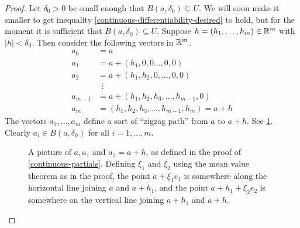 \begin{proof}[Proof]
	Let $\delta_0 > 0$ be small enough that $B(a, \delta_0) \subseteq U$. We will soon make it smaller to get inequality \eqref{continuous-differentiability-desired} to hold, but for the moment it is sufficient that $B(a, \delta_0) \subseteq U$. 
	Suppose $h = (h_1, \dotsc, h_m) \in \mathbb{R}^m$ with $|h| < \delta_0$. Then consider the following vectors in $\mathbb{R}^m$. 
	\[ \begin{aligned} 
	a_0 &= a \\
	a_1 &= a + (h_1, 0, 0 \dotsc, 0, 0) \\
	a_2 &= a + (h_1, h_2, 0, \dotsc, 0, 0) \\
	&\enspace \vdots \\
	a_{m-1} &= a + (h_1, h_2, h_3, \dotsc, h_{m-1}, 0) \\
	a_m &= (h_1, h_2, h_3, \dotsc, h_{m-1}, h_m) = a + h \end{aligned} \]
	The vectors $a_0, \dotsc, a_m$ define a sort of ``zigzag path'' from $a$ to $a + h$. See \cref{continuous-differentiability-picture}. Clearly $a_i \in B(a, \delta_0)$ for all $i = 1, \dotsc, m$. 
	\begin{figure}
		\begin{center}
		\end{center}
		\caption{A picture of $a, a_1$ and $a_2 = a + h$, as defined in the proof of \cref{continuous-partials}. Defining $\xi_1$ and $\xi_2$ using the mean value theorem as in the proof, the point $a + \xi_1e_1$ is somewhere along the horizontal line joining $a$ and $a+h_1$, and the point $a+h_1 + \xi_2e_2$ is somewhere on the vertical line joining $a+h_1$ and $a+h$.}  \label{continuous-differentiability-picture}
	\end{figure}
	

\end{proof}
